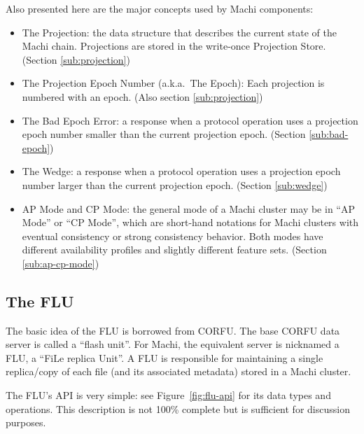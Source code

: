 \documentclass[preprint,10pt]{sigplanconf}
\begin{document}
Also presented here are the major concepts used by Machi components:
\begin{itemize}
\item The Projection: the data structure that describes the current
  state of the Machi chain.  
  Projections are stored in the write-once Projection Store.
(Section \ref{sub:projection})
\item The Projection Epoch Number (a.k.a.~The Epoch): Each projection
  is numbered with an epoch.
(Also section \ref{sub:projection})
\item The Bad Epoch Error: a response when a protocol operation uses a
  projection epoch number smaller than the current projection epoch.
(Section \ref{sub:bad-epoch})
\item The Wedge: a response when a protocol operation uses a
  projection epoch number larger than the current projection epoch.
(Section \ref{sub:wedge})
\item AP Mode and CP Mode: the general mode of a Machi cluster may be
  in ``AP Mode'' or ``CP Mode'', which are short-hand notations for
  Machi clusters with eventual consistency or strong consistency
  behavior.  Both modes have different availability profiles and
  slightly different feature sets.  (Section \ref{sub:ap-cp-mode})
\end{itemize}

\subsection{The FLU}
\label{sub:flu}

The basic idea of the FLU is borrowed from CORFU.  The base CORFU
data server is called a ``flash unit''.  For Machi, the equivalent
server is nicknamed a FLU, a ``FiLe replica Unit''.  A FLU is
responsible for maintaining a single replica/copy of each file
(and its associated metadata) stored in a Machi cluster.

The FLU's API is very simple: see Figure~\ref{fig:flu-api} for its
data types and operations.  This description is not 100\% complete but
is sufficient for discussion purposes.
\end{document}

